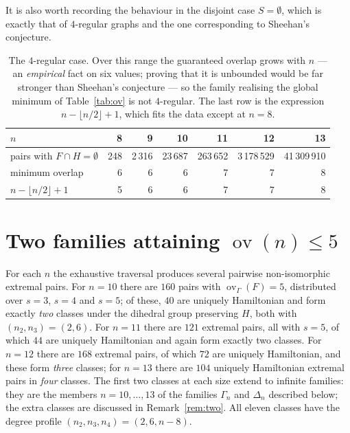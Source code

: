 \documentclass[11pt,a4paper]{article}
\theoremstyle{definition}
\theoremstyle{remark}
\newcommand{\ov}{\operatorname{ov}}
\begin{document}
It is also worth recording the behaviour in the disjoint case $S=\emptyset$, which is exactly that of $4$-regular graphs and the one corresponding to Sheehan's conjecture.

\begin{table}[h]
\centering
\begin{tabular}{lrrrrrr}
\toprule
$n$ & 8 & 9 & 10 & 11 & 12 & 13\\
\midrule
pairs with $F\cap H=\emptyset$ & 248 & 2\,316 & 23\,687 & 263\,652 & 3\,178\,529 & 41\,309\,910\\
minimum overlap & 6 & 6 & 6 & 7 & 7 & 8\\
$n-\lfloor n/2\rfloor+1$ & 5 & 6 & 6 & 7 & 7 & 8\\
\bottomrule
\end{tabular}
\caption{The $4$-regular case. Over this range the guaranteed overlap grows with $n$ --- an \emph{empirical} fact on six values; proving that it is unbounded would be far stronger than Sheehan's conjecture --- so the family realising the global minimum of Table~\ref{tab:ov} is not $4$-regular. The last row is the expression $n-\lfloor n/2\rfloor+1$, which fits the data except at $n=8$.}\label{tab:reg4}
\end{table}

\section{Two families attaining \texorpdfstring{$\ov(n)\le5$}{ov(n) <= 5}}\label{sec:family}

For each $n$ the exhaustive traversal produces several pairwise non-isomorphic extremal pairs. For $n=10$ there are $160$ pairs with $\ov_\Gamma(F)=5$, distributed over $s=3$, $s=4$ and $s=5$; of these, $40$ are uniquely Hamiltonian and form exactly \emph{two} classes under the dihedral group preserving $H$, both with $(n_2,n_3)=(2,6)$. For $n=11$ there are $121$ extremal pairs, all with $s=5$, of which $44$ are uniquely Hamiltonian and again form exactly two classes. For $n=12$ there are $168$ extremal pairs, of which $72$ are uniquely Hamiltonian, and these form \emph{three} classes; for $n=13$ there are $104$ uniquely Hamiltonian extremal pairs in \emph{four} classes. The first two classes at each size extend to infinite families: they are the members $n=10,\dots,13$ of the families $\Gamma_n$ and $\Delta_n$ described below; the extra classes are discussed in Remark~\ref{rem:two}. All eleven classes have the degree profile $(n_2,n_3,n_4)=(2,6,n-8)$.
\end{document}
